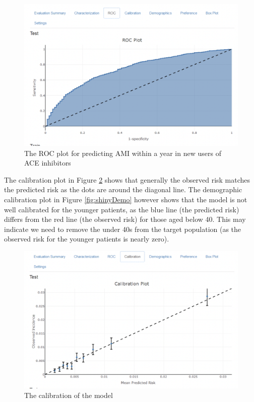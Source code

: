 \documentclass[11pt]{book}
\begin{document}
\begin{figure}

{\centering \includegraphics[width=0.8\linewidth]{images/PatientLevelPrediction/shiny/singleShiny/singleShinyRoc} 

}

\caption{The ROC plot for predicting AMI within a year in new users of ACE inhibitors}\label{fig:shinyROC}
\end{figure}

The calibration plot in Figure \ref{fig:shinyCal} shows that generally
the observed risk matches the predicted risk as the dots are around the
diagonal line. The demographic calibration plot in Figure
\ref{fig:shinyDemo} however shows that the model is not well calibrated
for the younger patients, as the blue line (the predicted risk) differs
from the red line (the observed risk) for those aged below 40. This may
indicate we need to remove the under 40s from the target population (as
the observed risk for the younger patients is nearly zero).

\begin{figure}

{\centering \includegraphics[width=0.8\linewidth]{images/PatientLevelPrediction/shiny/singleShiny/singleShinyCal} 

}

\caption{The calibration of the model}\label{fig:shinyCal}
\end{figure}
\end{document}
